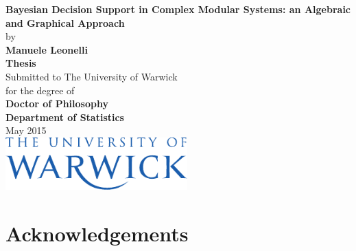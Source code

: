 \documentclass[11pt, oneside]{Thesis} %
\begin{document}
\begin{spacing}{2}
\setlength{\unitlength}{1mm}
\begin{center}
\textbf{\LARGE{Bayesian Decision Support in Complex Modular Systems: an Algebraic and Graphical Approach}}\\
\vspace{0.5cm}
\Large{by}\\
\textbf{\LARGE{Manuele Leonelli}}\\
\vspace{0.5cm}
\textbf{\Large{Thesis}}\\
\Large{Submitted to The University of Warwick\\ for the degree of}\\
\textbf{\Large{Doctor of Philosophy}}\\
\vspace{1cm}
\textbf{\LARGE{Department of Statistics}}\\
\Large{May 2015}\\
\vspace{1cm}
\includegraphics[width=7cm]{the_warwick_uni_blue}
\end{center}
\end{spacing}

\clearpage

\pagestyle{fancy} %

\tableofcontents %


\clearpage 





\chapter*{Acknowledgements}
\thispagestyle{empty}
\end{document}
